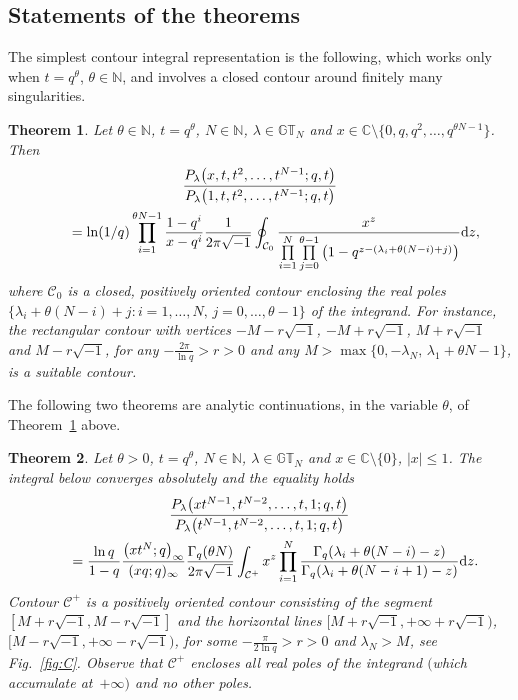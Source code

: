 \documentclass[pdftex]{sigma}
\numberwithin{equation}{section}
\newtheorem{thm}{Theorem}[section]
\newcommand{\C}{\mathbb{C}}
\newcommand{\N}{\mathbb{N}}
\newcommand{\CC}{\mathcal{C}}
\newcommand{\GT}{\mathbb{GT}}
\begin{document}
\subsection{Statements of the theorems}


The simplest contour integral representation is the following, which works only when $t = q^{\theta}$, $\theta\in\N$, and involves a closed contour around f\/initely many singularities.


\begin{thm}\label{macdonaldthm1}
Let $\theta\in\N$, $t = q^{\theta}$, $N\in\N$, $\lambda\in\GT_N$ and $x\in\C \setminus \big\{0, q, q^2, \dots, q^{\theta N - 1}\big\}$. Then
\begin{gather}
\frac{P_{\lambda}\big(x, t, t^2, \dots, t^{N-1}; q, t\big)}{P_{\lambda}\big(1, t, t^2, \dots, t^{N-1}; q, t\big)} \nonumber\\
\qquad {} = \ln(1/q)\prod_{i=1}^{\theta N - 1}{\frac{1 - q^i}{x - q^i}}\frac{1}{2\pi\sqrt{-1}}\oint_{\CC_0}{\frac{x^z}{\prod\limits_{i=1}^N\prod\limits_{j=0}^{\theta -1}{\big(1 - q^{z - (\lambda_i + \theta(N-i) + j)}\big)}}{\rm d}z},\label{macdonaldthm1eqn}
\end{gather}
where $\CC_0$ is a closed, positively oriented contour enclosing the real poles $\{\lambda_i + \theta(N-i) + j \colon i = 1, \dots, N, \, j = 0, \dots, \theta - 1\}$ of the integrand. For instance, the rectangular contour with vertices $-M-r\sqrt{-1}$, $ -M+r\sqrt{-1}$, $M+r\sqrt{-1}$ and $M-r\sqrt{-1}$, for any $-\frac{2\pi}{\ln{q}} > r > 0$ and any $M > \max\{0, -\lambda_N, \, \lambda_1 + \theta N - 1\}$, is a suitable contour.
\end{thm}

The following two theorems are analytic continuations, in the variable $\theta$, of Theorem~\ref{macdonaldthm1} above.

\begin{thm}\label{macdonaldthm2}
Let $\theta > 0$, $t = q^{\theta}$, $N\in\N$, $\lambda\in\GT_N$ and $x\in\C \setminus \{0\}$, $|x|\leq 1$. The integral below converges absolutely and the equality holds
\begin{gather}
\frac{P_{\lambda}\big(xt^{N-1}, t^{N-2}, \dots, t, 1; q, t\big)}{P_{\lambda}\big(t^{N-1}, t^{N-2}, \dots, t, 1; q, t\big)}\nonumber\\
 \qquad{} = \frac{\ln q}{1 - q}\frac{\big(xt^N; q\big)_{\infty}}{(xq; q)_{\infty}}\frac{\Gamma_q(\theta N)}{2\pi\sqrt{-1}}\int_{\CC^+}{x^z\prod_{i=1}^N{\frac{\Gamma_q(\lambda_i + \theta(N-i)-z)}{\Gamma_q(\lambda_i + \theta(N-i+1)-z)}}{\rm d}z}.\label{macdonaldthm2eqn}
\end{gather}
Contour $\CC^+$ is a positively oriented contour consisting of the segment $[M+r\sqrt{-1}, M-r\sqrt{-1}]$ and the horizontal lines $[M+r\sqrt{-1}, +\infty+r\sqrt{-1})$, $[M-r\sqrt{-1}, +\infty-r\sqrt{-1})$, for some $-\frac{\pi}{2\ln{q}} > r > 0$ and $\lambda_N > M$, see Fig.~{\rm \ref{fig:C}}. Observe that $\CC^+$ encloses all real poles of the integrand $($which accumulate at~$+\infty)$ and no other poles.
\end{thm}
\end{document}
